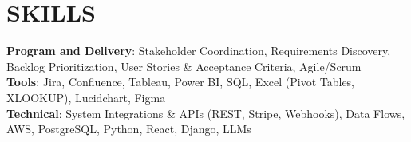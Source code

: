 \documentclass[letterpaper,11pt]{article}
\newcommand{\SectionListBegin}{\begin{itemize}[leftmargin=0.15in, label={}]}
\newcommand{\SectionListEnd}{\end{itemize}}
\newcommand{\swallow}[1]{}
\begin{document}
\section{SKILLS}
  \SectionListBegin
    \small{\item{
    \vspace{1mm}
     \textbf{Program and Delivery}{: Stakeholder Coordination, Requirements Discovery, Backlog Prioritization, User Stories \& Acceptance Criteria, Agile/Scrum} \\
     \vspace{1mm}
     \textbf{Tools}{: Jira, Confluence, Tableau, Power BI, SQL, Excel (Pivot Tables, XLOOKUP), Lucidchart, Figma} \\
     \vspace{1mm}
     \textbf{Technical}{: System Integrations \& APIs (REST, Stripe, Webhooks), Data Flows, AWS, PostgreSQL, Python, React, Django, LLMs \swallow{LangChain, Claude Code, Docker, C++}} \\
    }}
  \SectionListEnd
\end{document}
